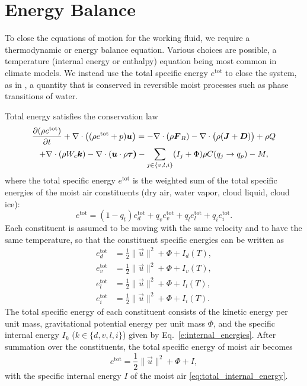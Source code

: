 \documentclass{report}
\begin{document}
\section{Energy Balance}\label{s:energy_balance}

To close the equations of motion for the working fluid, we require a thermodynamic or energy balance equation. Various choices are possible, a temperature (internal energy or enthalpy) equation being most common in climate models. We instead use the total specific energy $e^\mathrm{tot}$ to close the system, as in \citet{Romps08a}, a quantity that is conserved in reversible moist processes such as phase transitions of water. 

Total energy satisfies the conservation law \citep{Romps08a,Bott08a}
\begin{multline}
 \diff{(\rho e^\mathrm{tot})}{t} + \divergence \left( (\rho e^\mathrm{tot} + p)\vec{u} \right)
 = -\divergence (\rho \vec{F}_R) - \divergence \bigl(\rho (\vec{J} + \vec{D})\bigr) + \rho Q  \\
  +\divergence \left(\rho W_c \vec{k} \right)  - \divergence (\vec{u} \cdot \rho\vec{\tau)} %
   - \sum_{j\in\{v,l,i\}}(I_j + \Phi)  \rho C(q_j \rightarrow q_p) - M,
 \label{eq:energy_balance}
\end{multline}
where the total specific energy $e^{\mathrm{tot}}$ is the weighted sum of the total specific energies of the moist air constituents (dry air, water vapor, cloud liquid, cloud ice):
\begin{equation}\label{e:energy_sum}
    e^{\mathrm{tot}} = (1-q_t) e_d^{\mathrm{tot}} + q_v e_v^{\mathrm{tot}} + q_l e_l^{\mathrm{tot}} + q_i e_i^{\mathrm{tot}}.
\end{equation}
Each constituent is assumed to be moving with the same velocity and to have the same temperature, so that the constituent specific energies can be written as
\begin{subequations}\label{e:constituent_energies}
\begin{align}
e_d^{\mathrm{tot}} & = \frac{1}{2} \| \vec{u} \|^2 + \Phi + I_d(T), \\
e_v^{\mathrm{tot}} & = \frac{1}{2} \| \vec{u} \|^2 + \Phi + I_v(T), \\
e_l^{\mathrm{tot}} & = \frac{1}{2} \| \vec{u} \|^2 + \Phi + I_l(T), \\
e_i^{\mathrm{tot}} & = \frac{1}{2} \| \vec{u} \|^2 + \Phi + I_i(T).
\end{align}
\end{subequations}
The total specific energy of each constituent consists of the kinetic energy per unit mass, gravitational potential energy per unit mass $\Phi$, and the specific internal energy $I_k$ ($k \in \{d, v, l, i\}$) given by Eq.~\eqref{e:internal_energies}. After summation over the constituents, the total specific energy of moist air becomes
\begin{equation}
     e^{\mathrm{tot}} = \frac{1}{2} \| \vec{u} \|^2 + \Phi + I,
     \label{eq:total_energy_def}
\end{equation}
with the specific internal energy $I$ of the moist air \eqref{eq:total_internal_energy}.
\end{document}
